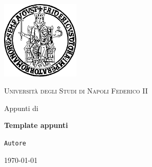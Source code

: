 \documentclass[12pt,a4paper,oneside]{report}
\begin{document}
\begin{titlepage}
  \thispagestyle{empty}
  \begin{center}
    \vspace*{1.0cm}

    \includegraphics[width=0.28\textwidth]{res/uni_logo.pdf}

    \vspace{1.2cm}
    {\Large\textsc{Università degli Studi di Napoli Federico II}\par}

    \vspace{1.2cm}
    {\large Appunti di\par}
    \vspace{0.25cm}
    {\Huge\bfseries\textcolor{uninaPrimary}{Template appunti}\par}

    \vspace{1.4cm}
    {\Large \texttt{\textcolor{uninaPrimary}{Autore}}\par}

    \vfill
    {\large \today\par}
  \end{center}
\end{titlepage}

\cleardoublepage
{}
{}
\tableofcontents
\listofteorema
\listofdefinizione

\cleardoublepage


% 
% 
\end{document}

